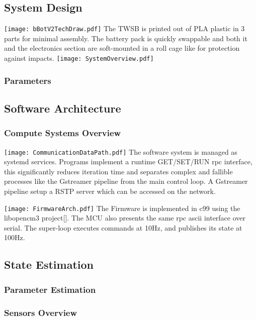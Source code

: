     \subsection{System Design}
        \texttt{[image: bBotV2TechDraw.pdf]}
        The TWSB is printed out of PLA plastic in 3 parts for minimal assembly.
        The battery pack is quickly swappable and both it and the electronics section 
        are soft-mounted in a roll cage like for protection against impacts. 
        \texttt{[image: SystemOverview.pdf]}
        
        \subsubsection{Parameters}

        \subsection{Software Architecture}
        \subsubsection{Compute Systems Overview }
        \texttt{[image: CommunicationDataPath.pdf]}  
            The software system is managed as systemd services.
            Programs implement a runtime GET/SET/RUN rpc interface,
            this significantly reduces iteration time and separates 
            complex and fallible processes like the Gstreamer pipeline 
            from the main control loop. 
            A Gstreamer pipeline setup a RSTP server which can be accessed on the network.

        \texttt{[image: FirmwareArch.pdf]}
            The Firmware is implemented in c99 using the libopencm3 project[].
            The MCU also presents the same rpc ascii interface over serial. 
            The super-loop executes commands at 10Hz, 
            and publishes its state at 100Hz.


        

    \subsection{State Estimation}
        \subsubsection{Parameter Estimation}
        \subsubsection{Sensors Overview}

